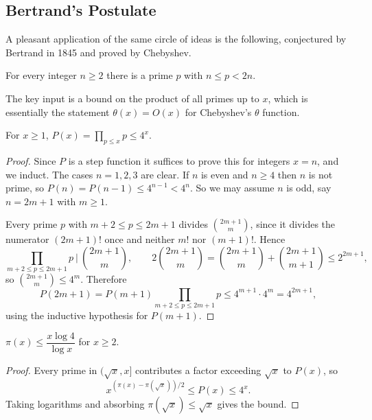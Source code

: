 \documentclass[a4paper]{scrartcl}
\begin{document}
\subsection{Bertrand's Postulate}

A pleasant application of the same circle of ideas is the following, conjectured by Bertrand in 1845 and proved by Chebyshev.

\begin{theorem}\label{thm:bertrand}
	For every integer $n \geq 2$ there is a prime $p$ with $n \leq p < 2n$.
\end{theorem}

The key input is a bound on the product of all primes up to $x$, which is essentially the statement $\theta(x) = O(x)$ for Chebyshev's $\theta$ function.

\begin{lemma}\label{lem:primeprod}
	For $x \geq 1$, $\displaystyle P(x) = \prod_{p \leq x}p \leq 4^x$.
\end{lemma}
\begin{proof}
	Since $P$ is a step function it suffices to prove this for integers $x = n$, and we induct. The cases $n = 1, 2, 3$ are clear. If $n$ is even and $n \geq 4$ then $n$ is not prime, so $P(n) = P(n-1) \leq 4^{n-1} < 4^n$. So we may assume $n$ is odd, say $n = 2m+1$ with $m \geq 1$.

	Every prime $p$ with $m + 2 \leq p \leq 2m+1$ divides $\binom{2m+1}m$, since it divides the numerator $(2m+1)!$ once and neither $m!$ nor $(m+1)!$. Hence
	$$
	\prod_{m+2 \leq p \leq 2m+1}p \ \Big| \ \binom{2m+1}m, \qquad 2\binom{2m+1}m = \binom{2m+1}m + \binom{2m+1}{m+1} \leq 2^{2m+1},
	$$
	so $\binom{2m+1}m \leq 4^m$. Therefore
	$$
	P(2m+1) = P(m+1)\prod_{m+2\leq p\leq 2m+1}p \leq 4^{m+1}\cdot 4^m = 4^{2m+1},
	$$
	using the inductive hypothesis for $P(m+1)$.
\end{proof}

\begin{corollary}
	$\pi(x) \leq \dfrac{x\log 4}{\log x}$ for $x \geq 2$.
\end{corollary}
\begin{proof}
	Every prime in $(\sqrt x, x]$ contributes a factor exceeding $\sqrt x$ to $P(x)$, so
	$$
	x^{(\pi(x) - \pi(\sqrt x))/2} \leq P(x) \leq 4^x.
	$$
	Taking logarithms and absorbing $\pi(\sqrt x) \leq \sqrt x$ gives the bound.
\end{proof}
\end{document}
